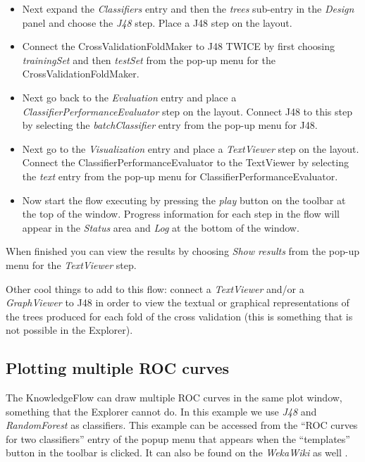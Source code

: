 \begin{itemize}
	\item Next expand the \textit{Classifiers} entry and then the
          \textit{trees} sub-entry in the \textit{Design} panel and
          choose the \textit{J48} step. Place a J48 step on
          the layout.

	\item Connect the CrossValidationFoldMaker to J48 TWICE by first choosing
	\textit{trainingSet} and then \textit{testSet} from the pop-up menu for the
	CrossValidationFoldMaker.

	\item Next go back to the \textit{Evaluation} entry and place
          a \textit{ClassifierPerformanceEvaluator} step on the
          layout. Connect J48 to this step by selecting the
          \textit{batchClassifier} entry from the pop-up menu for J48.

	\item Next go to the \textit{Visualization} entry and place a \textit{TextViewer}
	step on the layout. Connect the ClassifierPerformanceEvaluator to
	the TextViewer by selecting the \textit{text} entry from the pop-up menu for
	ClassifierPerformanceEvaluator.

	\item Now start the flow executing by pressing the
          \textit{play} button on the toolbar at the top of the
          window. Progress information for each step in the flow
          will appear in the \textit{Status} area and \textit{Log} at
          the bottom of the window.
\end{itemize}

When finished you can view the results by choosing \textit{Show results} from
the pop-up menu for the \textit{TextViewer} step.

Other cool things to add to this flow: connect a \textit{TextViewer} and/or a
\textit{GraphViewer} to J48 in order to view the textual or graphical
representations of the trees produced for each fold of the cross
validation (this is something that is not possible in the Explorer).


\newpage
\subsection{Plotting multiple ROC curves}
\label{exampleroc}
The KnowledgeFlow can draw multiple ROC curves in the same plot
window, something that the Explorer cannot do. In this example we use
\textit{J48} and \textit{RandomForest} as classifiers. This example
can be accessed from the ``ROC curves for two classifiers'' entry of
the popup menu that appears when the ``templates'' button in the
toolbar is clicked. It can also be found on the \textit{WekaWiki}
as well \cite{multipleroc}.

